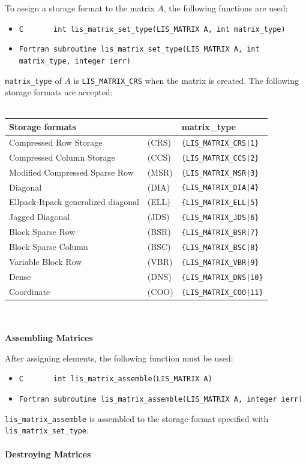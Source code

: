 \documentclass[a4paper]{article}
\begin{document}
To assign a storage format to the matrix $A$, 
the following functions are used: 
\begin{itemize}
\item \verb|C       int lis_matrix_set_type(LIS_MATRIX A, int matrix_type)|
\item \verb|Fortran subroutine lis_matrix_set_type(LIS_MATRIX A, int matrix_type, integer ierr)|
\end{itemize}
\verb+matrix_type+ of $A$ is \verb+LIS_MATRIX_CRS+ when the matrix is created. 
The following storage formats are accepted:
\\ \\
\begin{minipage}[t]{\textwidth}
\begin{center}
\begin{tabular}{lll}\hline\hline
Storage formats  & & matrix\_type \\ \hline
Compressed Row Storage & (CRS) & \verb={LIS_MATRIX_CRS|1}= \\
Compressed Column Storage & (CCS) & \verb={LIS_MATRIX_CCS|2}= \\
Modified Compressed Sparse Row & (MSR) & \verb={LIS_MATRIX_MSR|3}= \\
Diagonal &(DIA) & \verb={LIS_MATRIX_DIA|4}= \\
Ellpack-Itpack generalized diagonal &(ELL) & \verb={LIS_MATRIX_ELL|5}= \\
Jagged Diagonal &(JDS) & \verb={LIS_MATRIX_JDS|6}= \\
Block Sparse Row & (BSR) & \verb={LIS_MATRIX_BSR|7}= \\
Block Sparse Column &(BSC) & \verb={LIS_MATRIX_BSC|8}= \\
Variable Block Row &(VBR) & \verb={LIS_MATRIX_VBR|9}= \\
Dense &	(DNS) & \verb={LIS_MATRIX_DNS|10}= \\
Coordinate & (COO) & \verb={LIS_MATRIX_COO|11}= \\
\hline         
\end{tabular}
\end{center}
\end{minipage}
\\ \\
\noindent
{\bf Assembling Matrices}

After assigning elements, the following function must be used:
\begin{itemize}
\item \verb|C       int lis_matrix_assemble(LIS_MATRIX A)|
\item \verb|Fortran subroutine lis_matrix_assemble(LIS_MATRIX A, integer ierr)|
\end{itemize}
\verb|lis_matrix_assemble| is assembled to the storage format specified with \verb|lis_matrix_set_type|.
\\ \\ 
\noindent
{\bf Destroying Matrices}
\end{document}
